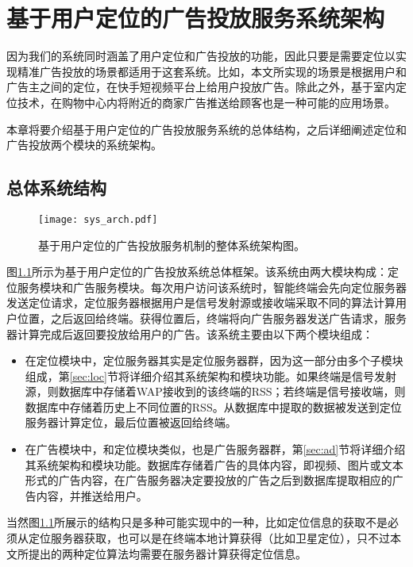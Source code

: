\chapter{基于用户定位的广告投放服务系统架构}
\label{cha:sys_arch}

因为我们的系统同时涵盖了用户定位和广告投放的功能，因此只要是需要定位以实现精准广告投放的场景都适用于这套系统。比如，本文所实现的场景是根据用户和广告主之间的定位，在快手短视频平台上给用户投放广告。除此之外，基于室内定位技术，在购物中心内将附近的商家广告推送给顾客也是一种可能的应用场景。

本章将要介绍基于用户定位的广告投放服务系统的总体结构，之后详细阐述定位和广告投放两个模块的系统架构。

\section{总体系统结构}

\begin{figure}[tb]
	\centering
	\texttt{[image: sys\_arch.pdf]}
	\caption{基于用户定位的广告投放服务机制的整体系统架构图。}
	\label{fig:sysarch}
\end{figure}

图\ref{fig:sysarch}所示为基于用户定位的广告投放系统总体框架。该系统由两大模块构成：定位服务模块和广告服务模块。每次用户访问该系统时，智能终端会先向定位服务器发送定位请求，定位服务器根据用户是信号发射源或接收端采取不同的算法计算用户位置，之后返回给终端。获得位置后，终端将向广告服务器发送广告请求，服务器计算完成后返回要投放给用户的广告。该系统主要由以下两个模块组成：
\begin{itemize}
	\item 在定位模块中，定位服务器其实是定位服务器群，因为这一部分由多个子模块组成，第\ref{sec:loc}节将详细介绍其系统架构和模块功能。如果终端是信号发射源，则数据库中存储着WAP接收到的该终端的RSS；若终端是信号接收端，则数据库中存储着历史上不同位置的RSS。从数据库中提取的数据被发送到定位服务器计算定位，最后位置被返回给终端。
	\item 在广告模块中，和定位模块类似，也是广告服务器群，第\ref{sec:ad}节将详细介绍其系统架构和模块功能。数据库存储着广告的具体内容，即视频、图片或文本形式的广告内容，在广告服务器决定要投放的广告之后到数据库提取相应的广告内容，并推送给用户。
\end{itemize}

当然图\ref{fig:sysarch}所展示的结构只是多种可能实现中的一种，比如定位信息的获取不是必须从定位服务器获取，也可以是在终端本地计算获得（比如卫星定位），只不过本文所提出的两种定位算法均需要在服务器计算获得定位信息。

